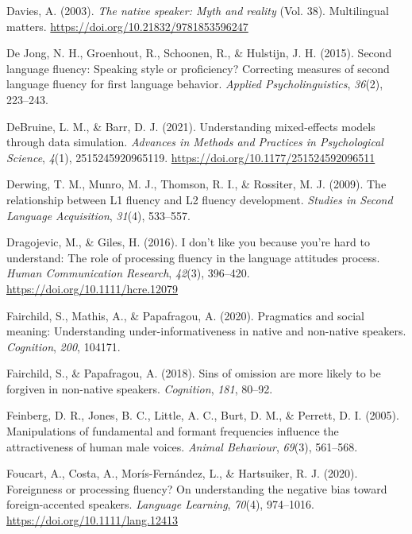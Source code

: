 \documentclass[
  man,floatsintext]{apa7}
\newlength{\cslhangindent}
\newlength{\cslentryspacingunit} %
\newenvironment{CSLReferences}[2] %
 {%
  \setlength{\parindent}{0pt}
  \ifodd #1
  \let\oldpar\par
  \def\par{\hangindent=\cslhangindent\oldpar}
  \fi
  \setlength{\parskip}{#2\cslentryspacingunit}
 }%
 {}
\begin{document}
\begin{CSLReferences}{1}{0}
\leavevmode{}%
Davies, A. (2003). \emph{The native speaker: Myth and reality} (Vol. 38). Multilingual matters. \url{https://doi.org/10.21832/9781853596247}

\leavevmode{}%
De Jong, N. H., Groenhout, R., Schoonen, R., \& Hulstijn, J. H. (2015). Second language fluency: Speaking style or proficiency? Correcting measures of second language fluency for first language behavior. \emph{Applied Psycholinguistics}, \emph{36}(2), 223--243.

\leavevmode{}%
DeBruine, L. M., \& Barr, D. J. (2021). Understanding mixed-effects models through data simulation. \emph{Advances in Methods and Practices in Psychological Science}, \emph{4}(1), 2515245920965119. \url{https://doi.org/10.1177/251524592096511}

\leavevmode{}%
Derwing, T. M., Munro, M. J., Thomson, R. I., \& Rossiter, M. J. (2009). The relationship between L1 fluency and L2 fluency development. \emph{Studies in Second Language Acquisition}, \emph{31}(4), 533--557.

\leavevmode{}%
Dragojevic, M., \& Giles, H. (2016). I don't like you because you're hard to understand: The role of processing fluency in the language attitudes process. \emph{Human Communication Research}, \emph{42}(3), 396--420. \url{https://doi.org/10.1111/hcre.12079}

\leavevmode{}%
Fairchild, S., Mathis, A., \& Papafragou, A. (2020). Pragmatics and social meaning: Understanding under-informativeness in native and non-native speakers. \emph{Cognition}, \emph{200}, 104171.

\leavevmode{}%
Fairchild, S., \& Papafragou, A. (2018). Sins of omission are more likely to be forgiven in non-native speakers. \emph{Cognition}, \emph{181}, 80--92.

\leavevmode{}%
Feinberg, D. R., Jones, B. C., Little, A. C., Burt, D. M., \& Perrett, D. I. (2005). Manipulations of fundamental and formant frequencies influence the attractiveness of human male voices. \emph{Animal Behaviour}, \emph{69}(3), 561--568.

\leavevmode{}%
Foucart, A., Costa, A., Morís-Fernández, L., \& Hartsuiker, R. J. (2020). Foreignness or processing {fluency? On} understanding the negative bias toward foreign-accented speakers. \emph{Language Learning}, \emph{70}(4), 974--1016. \url{https://doi.org/10.1111/lang.12413}


\end{CSLReferences}
\end{document}
